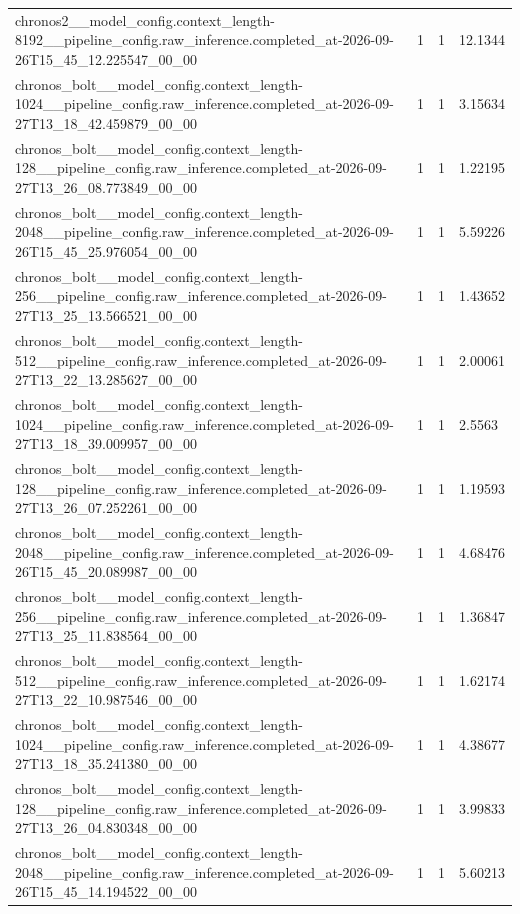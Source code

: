 \begin{tabular}{llll}
chronos2\_\_model\_config.context\_length-8192\_\_pipeline\_config.raw\_inference.completed\_at-2026-09-26T15\_45\_12.225547\_00\_00 & 1 & 1 & 12.1344 \\
chronos\_bolt\_\_model\_config.context\_length-1024\_\_pipeline\_config.raw\_inference.completed\_at-2026-09-27T13\_18\_42.459879\_00\_00 & 1 & 1 & 3.15634 \\
chronos\_bolt\_\_model\_config.context\_length-128\_\_pipeline\_config.raw\_inference.completed\_at-2026-09-27T13\_26\_08.773849\_00\_00 & 1 & 1 & 1.22195 \\
chronos\_bolt\_\_model\_config.context\_length-2048\_\_pipeline\_config.raw\_inference.completed\_at-2026-09-26T15\_45\_25.976054\_00\_00 & 1 & 1 & 5.59226 \\
chronos\_bolt\_\_model\_config.context\_length-256\_\_pipeline\_config.raw\_inference.completed\_at-2026-09-27T13\_25\_13.566521\_00\_00 & 1 & 1 & 1.43652 \\
chronos\_bolt\_\_model\_config.context\_length-512\_\_pipeline\_config.raw\_inference.completed\_at-2026-09-27T13\_22\_13.285627\_00\_00 & 1 & 1 & 2.00061 \\
chronos\_bolt\_\_model\_config.context\_length-1024\_\_pipeline\_config.raw\_inference.completed\_at-2026-09-27T13\_18\_39.009957\_00\_00 & 1 & 1 & 2.5563 \\
chronos\_bolt\_\_model\_config.context\_length-128\_\_pipeline\_config.raw\_inference.completed\_at-2026-09-27T13\_26\_07.252261\_00\_00 & 1 & 1 & 1.19593 \\
chronos\_bolt\_\_model\_config.context\_length-2048\_\_pipeline\_config.raw\_inference.completed\_at-2026-09-26T15\_45\_20.089987\_00\_00 & 1 & 1 & 4.68476 \\
chronos\_bolt\_\_model\_config.context\_length-256\_\_pipeline\_config.raw\_inference.completed\_at-2026-09-27T13\_25\_11.838564\_00\_00 & 1 & 1 & 1.36847 \\
chronos\_bolt\_\_model\_config.context\_length-512\_\_pipeline\_config.raw\_inference.completed\_at-2026-09-27T13\_22\_10.987546\_00\_00 & 1 & 1 & 1.62174 \\
chronos\_bolt\_\_model\_config.context\_length-1024\_\_pipeline\_config.raw\_inference.completed\_at-2026-09-27T13\_18\_35.241380\_00\_00 & 1 & 1 & 4.38677 \\
chronos\_bolt\_\_model\_config.context\_length-128\_\_pipeline\_config.raw\_inference.completed\_at-2026-09-27T13\_26\_04.830348\_00\_00 & 1 & 1 & 3.99833 \\
chronos\_bolt\_\_model\_config.context\_length-2048\_\_pipeline\_config.raw\_inference.completed\_at-2026-09-26T15\_45\_14.194522\_00\_00 & 1 & 1 & 5.60213 \\

\end{tabular}
